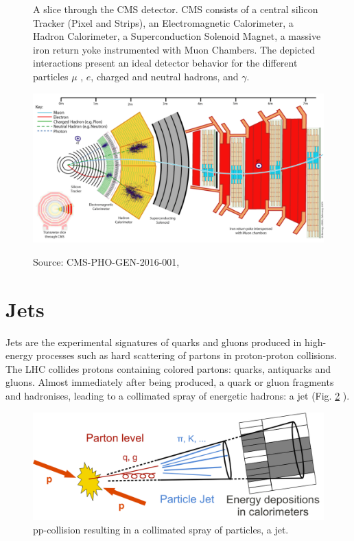 \begin{figure}[htp]
\caption{A slice through the CMS detector. CMS consists of a central silicon Tracker (Pixel and Strips), an Electromagnetic Calorimeter, a Hadron Calorimeter, a Superconduction Solenoid Magnet, a massive iron return yoke instrumented with Muon Chambers. The depicted interactions present an ideal detector behavior for the
different particles $\mu$ , $e$, charged and neutral hadrons, and $\gamma$.}
  \centering
\includegraphics[width=16cm]{CMS_chapter_plots/CMS_Slice}
\label{figure}
\caption*{Source: CMS-PHO-GEN-2016-001, \cite{Barney:2120661}}
\end{figure}

\section{Jets }\label{aniktlab}

Jets are the experimental signatures of quarks and gluons produced in high-energy processes such as hard scattering of partons in proton-proton collisions. The LHC collides protons containing colored partons: quarks, antiquarks and gluons. Almost immediately after being produced, a quark or gluon fragments and hadronises, leading to a collimated spray of energetic hadrons: a jet (Fig. \ref{jet1figure} ).
\begin{figure}[H]
\caption{pp-collision resulting in a collimated spray of particles, a jet. \label{jet1figure}}
  \centering
\includegraphics[width=12cm]{physics_objects_plots/Jet1}
\end{figure}

